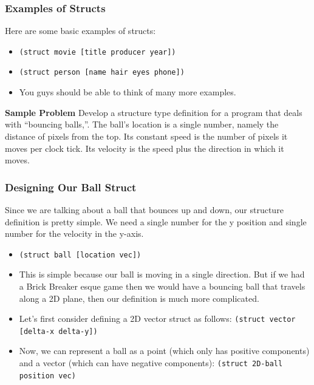 \documentclass{beamer}
\begin{document}
\begin{frame}
  \frametitle{Examples of Structs}
  Here are some basic examples of structs:
  \begin{itemize}
  \item<2-> \texttt{(struct movie [title producer year])}
  \item<3-> \texttt{(struct person [name hair eyes phone])}
  \item<4-> You guys should be able to think of many more examples.
  \end{itemize}
  \pause
  \textbf{Sample Problem} Develop a structure type definition for a program that deals with “bouncing balls,”. The ball’s location is a single number, namely the distance of pixels from the top. Its constant speed is the number of pixels it moves per clock tick. Its velocity is the speed plus the direction in which it moves.
\end{frame}

\begin{frame}
  \frametitle{Designing Our Ball Struct}
  Since we are talking about a ball that bounces up and down, our structure definition is pretty simple. We need a single number for the y position and single
  number for the velocity in the y-axis.
  \begin{itemize}
  \item<2-> \texttt{(struct ball [location vec])}
  \item<3-> This is simple because our ball is moving in a single direction. But if we had a Brick Breaker esque game then we would have a bouncing ball that
    travels along a 2D plane, then our definition is much more complicated.
  \item<4-> Let's first consider defining a 2D vector struct as follows: \texttt{(struct vector [delta-x delta-y])}
  \item<5-> Now, we can represent a ball as a point (which only has positive components) and a vector (which can have negative components):
    \texttt{(struct 2D-ball position vec)}
  \end{itemize}
\end{frame}

\end{document}
